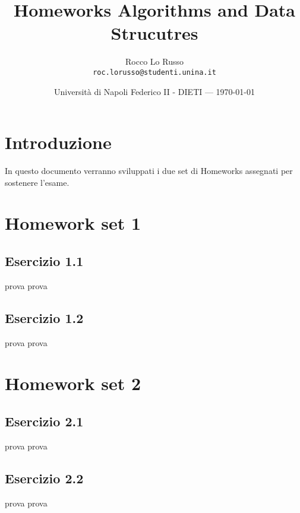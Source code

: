 \documentclass{article}
\title{Homeworks Algorithms and Data Strucutres} %
\author{Rocco Lo Russo\\ \texttt{roc.lorusso@studenti.unina.it}} %
\date{Università di Napoli Federico II - DIETI --- \today} %
\begin{document}
\maketitle %


\section*{Introduzione} %
In questo documento verranno sviluppati i due set di Homeworks assegnati per sostenere l'esame.

\section{Homework set 1} \label{sec:homework_1}%
\subsection{Esercizio 1.1} \label{subsec:esercizio1_1}
prova prova
\subsection{Esercizio 1.2} \label{subsec:esercizio1_2}
prova prova
\section{Homework set 2} \label{sec:homework_2}%
\subsection{Esercizio 2.1} \label{subsec:esercizio2_1}
prova prova
\subsection{Esercizio 2.2} \label{subsec:esercizio2_2}
prova prova
\end{document}
